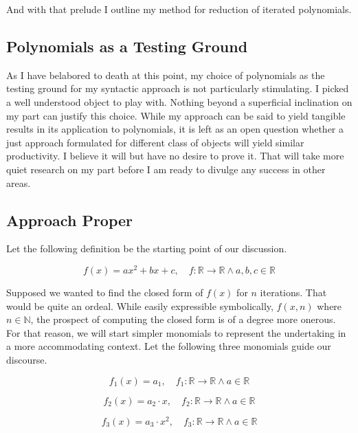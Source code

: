 \documentclass[12pt]{article}
\begin{document}
And with that prelude I outline my method for reduction of iterated
polynomials.

\subsection{Polynomials as a Testing Ground}
As I have belabored to death at this point, my choice of polynomials as the
testing ground for my syntactic approach is not particularly stimulating. I
picked a well understood object to play with. Nothing beyond a superficial
inclination on my part can justify this choice. While my approach can be said
to yield tangible results in its application to polynomials, it is left as an
open question whether a just approach formulated for different class of objects
will yield similar productivity. I believe it will but have no desire to prove
it. That will take more quiet research on my part before I am ready to divulge
any success in other areas.

\subsection{Approach Proper}
Let the following definition be the starting point of our discussion.

\begin{equation}
    f(x)=ax^2 + bx + c, \quad f: \mathbb{R} \rightarrow \mathbb{R} \land a,b,c \in \mathbb{R}
\end{equation}

Supposed we wanted to find the closed form of $f(x)$ for $n$ iterations. That
would be quite an ordeal. While easily expressible symbolically, $f(x,n)$ where
$n \in \mathbb{N}$, the prospect of computing the closed form is of a degree
more onerous. For that reason, we will start simpler monomials to represent the
undertaking in a more accommodating context. Let the following three monomials
guide our discourse.

\begin{equation}
    f_1(x) = a_1, \quad f_1: \mathbb{R} \rightarrow \mathbb{R} \land a \in \mathbb{R}
\end{equation}

\begin{equation}
    f_2(x) = a_2 \cdot x, \quad f_2: \mathbb{R} \rightarrow \mathbb{R} \land a \in \mathbb{R}
\end{equation}

\begin{equation}
    f_3(x) = a_3 \cdot x^2, \quad f_3: \mathbb{R} \rightarrow \mathbb{R} \land a \in \mathbb{R}
\end{equation}
\end{document}

